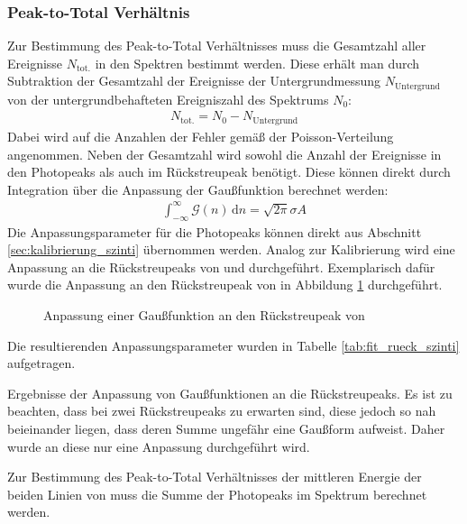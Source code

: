 \documentclass[11pt, a4paper]{article}
\numberwithin{equation}{section}
\newcommand{\co}{\isotope[60]{Co}}
\begin{document}
\subsubsection{Peak-to-Total Verhältnis}
\label{sec:ptt_szinti}
Zur Bestimmung des Peak-to-Total Verhältnisses muss die Gesamtzahl aller Ereignisse $N_\mathrm{tot.}$ in den Spektren bestimmt werden.
Diese erhält man durch Subtraktion der Gesamtzahl der Ereignisse der Untergrundmessung $N_\mathrm{Untergrund}$ von der untergrundbehafteten Ereigniszahl des Spektrums $N_0$:
\begin{align}
	N_\mathrm{tot.} = N_\mathrm{0} - N_\mathrm{Untergrund}
\end{align}
Dabei wird auf die Anzahlen der Fehler gemäß der Poisson-Verteilung angenommen.
Neben der Gesamtzahl wird sowohl die Anzahl der Ereignisse in den Photopeaks als auch im Rückstreupeak benötigt.
Diese können direkt durch Integration über die Anpassung der Gaußfunktion berechnet werden:
\begin{align}
\int_{-\infty}^{\infty} \mathcal{G}(n) \, \mathrm{d}n = \sqrt{2 \pi} \sigma A
\label{eq:integral_peak}
\end{align}
Die Anpassungsparameter für die Photopeaks können direkt aus Abschnitt \ref{sec:kalibrierung_szinti} übernommen werden.
Analog zur Kalibrierung wird eine Anpassung an die Rückstreupeaks von  und  durchgeführt.
Exemplarisch dafür wurde die Anpassung an den Rückstreupeak von  in Abbildung \ref{fig:fit_rueck_szinti} durchgeführt.
\begin{figure}[h]
	\centering
	
	\caption{Anpassung einer Gaußfunktion an den Rückstreupeak von }
	\label{fig:fit_rueck_szinti}
\end{figure}
Die resultierenden Anpassungsparameter wurden in Tabelle \ref{tab:fit_rueck_szinti} aufgetragen.
\begin{table}[ht]
	\centering
	
	\caption{Ergebnisse der Anpassung von Gaußfunktionen an die Rückstreupeaks. Es ist zu beachten, dass bei \co{} zwei Rückstreupeaks zu erwarten sind, diese jedoch so nah beieinander liegen, dass deren Summe ungefähr eine Gaußform aufweist. Daher wurde an diese nur eine Anpassung durchgeführt wird.}
	\label{tab:fit_rueck_szinti}
\end{table}
Zur Bestimmung des Peak-to-Total Verhältnisses der mittleren Energie der beiden Linien von  muss die Summe der Photopeaks im Spektrum berechnet werden.
\end{document}
